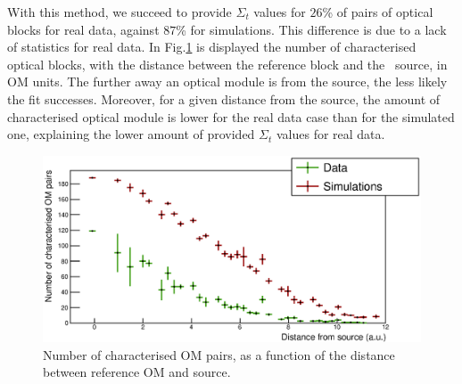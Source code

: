 
With this method, we succeed to provide $\Sigma_{t}$ values for $26$\% of pairs of optical blocks for real data, against $87$\% for simulations.
This difference is due to a lack of statistics for real data.
In Fig.\ref{fig:Co_sigma_distance} is displayed the number of characterised optical blocks, with the distance between the reference block and the \Co\ source, in OM units.
The further away an optical module is from the source, the less likely the fit successes.
Moreover, for a given distance from the source, the amount of characterised optical module is lower for the real data case than for the simulated one, explaining the lower amount of provided $\Sigma_{t}$ values for real data.
\begin{figure}[h]
  \centering
  \includegraphics[width=15cm]{commissioning/fig_commissioning/Co_sigma_distance.eps}
  \caption{Number of characterised OM pairs, as a function of the distance between reference OM and source.
    \label{fig:Co_sigma_distance}}
\end{figure}


